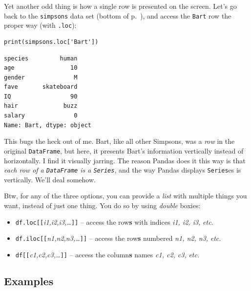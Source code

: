 
Yet another odd thing is how a single row is presented on the screen. Let's go
back to the \texttt{simpsons} data set (bottom of p.~\pageref{finalSimpsons}),
and access the \texttt{Bart} row the proper way (with \texttt{.loc}):

\begin{Verbatim}[fontsize=\small,samepage=true,frame=single,framesep=3mm]
print(simpsons.loc['Bart'])
\end{Verbatim}
\vspace{-.2in}

\begin{Verbatim}[fontsize=\small,samepage=true,frame=leftline,framesep=5mm,framerule=1mm]
species         human
age                10
gender              M
fave       skateboard
IQ                 90
hair             buzz
salary              0
Name: Bart, dtype: object
\end{Verbatim}

This bugs the heck out of me. Bart, like all other Simpsons, was a \textit{row}
in the original \texttt{DataFrame}, but here, it presents Bart's information
vertically instead of horizontally. I find it visually jarring. The reason
Pandas does it this way is that \textit{each row of a \texttt{DataFrame} is a
\texttt{Series}}, and the way Pandas displays \texttt{Series}es is vertically.
We'll deal somehow.


Btw, for any of the three options, you can provide a \textit{list} with
multiple things you want, instead of just one thing. You do so by using
\textit{double} boxies:

\begin{itemize}[nosep]
\item \texttt{df.loc[[}\textsl{i1,i2,i3,\dots}\texttt{]]} -- access the
row\textbf{s} with indices \textsl{i1, i2, i3,} \textit{etc.}
\item \texttt{df.iloc[[}\textsl{n1,n2,n3,\dots}\texttt{]]} -- access the row\textbf{s}
numbered \textsl{n1, n2, n3,} \textit{etc.}
\item \texttt{df[[}\textsl{c1,c2,c3,\dots}\texttt{]]} -- access the
column\textbf{s} names \textsl{c1, c2, c3,} \textit{etc.}
\end{itemize}

\subsection{Examples}

